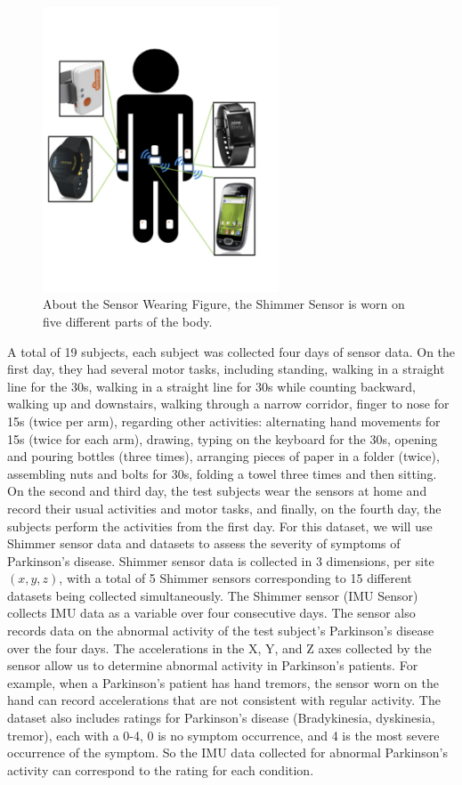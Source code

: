 \begin{figure}[htbp]
    \centering
    \includegraphics[width=7cm]{report/pics/Sensor.png}
    \caption{About the Sensor Wearing Figure, the Shimmer Sensor is worn on five different parts of the body. \cite{MJFF}}
    \label{fig:my_label}
\end{figure}



A total of 19 subjects, each subject was collected four days of sensor data. On the first day, they had several motor tasks, including standing, walking in a straight line for the 30s, walking in a straight line for 30s while counting backward, walking up and downstairs, walking through a narrow corridor, finger to nose for 15s (twice per arm), regarding other activities: alternating hand movements for 15s (twice for each arm), drawing, typing on the keyboard for the 30s, opening and pouring bottles (three times), arranging pieces of paper in a folder (twice), assembling nuts and bolts for 30s, folding a towel three times and then sitting. On the second and third day, the test subjects wear the sensors at home and record their usual activities and motor tasks, and finally, on the fourth day, the subjects perform the activities from the first day. For this dataset, we will use Shimmer sensor data and datasets to assess the severity of symptoms of Parkinson's disease. Shimmer sensor data is collected in 3 dimensions, per site $(x, y, z)$, with a total of 5 Shimmer sensors corresponding to 15 different datasets being collected simultaneously. The Shimmer sensor (IMU Sensor) collects IMU data as a variable over four consecutive days. The sensor also records data on the abnormal activity of the test subject's Parkinson's disease over the four days. The accelerations in the X, Y, and Z axes collected by the sensor allow us to determine abnormal activity in Parkinson's patients. For example, when a Parkinson's patient has hand tremors, the sensor worn on the hand can record accelerations that are not consistent with regular activity. The dataset also includes ratings for Parkinson's disease (Bradykinesia, dyskinesia, tremor), each with a 0-4, 0 is no symptom occurrence, and 4 is the most severe occurrence of the symptom. So the IMU data collected for abnormal Parkinson's activity can correspond to the rating for each condition. \cite{MJFF}
\\




